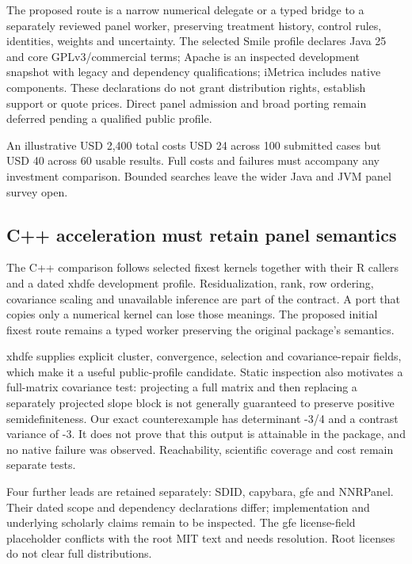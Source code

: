 The proposed route is a narrow numerical delegate or a typed bridge to a
separately reviewed panel worker, preserving treatment history, control
rules, identities, weights and uncertainty. The selected Smile profile
declares Java 25 and core GPLv3/commercial terms; Apache is an inspected
development snapshot with legacy and dependency qualifications; iMetrica
includes native components. These declarations do not grant distribution
rights, establish support or quote prices. Direct panel admission and
broad porting remain deferred pending a qualified public profile.
\citep{exec25_paneljava_smile,exec25_paneljava_commons,exec25_paneljava_imetrica}

An illustrative USD 2,400 total costs USD 24 across 100 submitted cases
but USD 40 across 60 usable results. Full costs and failures must
accompany any investment comparison. Bounded searches leave the wider
Java and JVM panel survey open. \citep{exec25_paneljava_reference}

\hypertarget{c-acceleration-must-retain-panel-semantics}{%
\subsection{C++ acceleration must retain panel
semantics}\label{c-acceleration-must-retain-panel-semantics}}

The C++ comparison follows selected fixest kernels together with their R
callers and a dated xhdfe development profile. Residualization, rank,
row ordering, covariance scaling and unavailable inference are part of
the contract. A port that copies only a numerical kernel can lose those
meanings. The proposed initial fixest route remains a typed worker
preserving the original package's semantics.
\citep{exec25_panelcxx_fixest,exec20_fixest_source}

xhdfe supplies explicit cluster, convergence, selection and
covariance-repair fields, which make it a useful public-profile
candidate. Static inspection also motivates a full-matrix covariance
test: projecting a full matrix and then replacing a separately projected
slope block is not generally guaranteed to preserve positive
semidefiniteness. Our exact counterexample has determinant -3/4 and a
contrast variance of -3. It does not prove that this output is
attainable in the package, and no native failure was observed.
Reachability, scientific coverage and cost remain separate tests.
\citep{exec25_panelcxx_xhdfe,exec25_panelcxx_reference}

Four further leads are retained separately: SDID, capybara, gfe and
NNRPanel. Their dated scope and dependency declarations differ;
implementation and underlying scholarly claims remain to be inspected.
The gfe license-field placeholder conflicts with the root MIT text and
needs resolution. Root licenses do not clear full distributions.
\citep{exec25_panelcxx_sdid,exec25_panelcxx_capybara,exec25_panelcxx_gfe,exec25_panelcxx_nnr}

